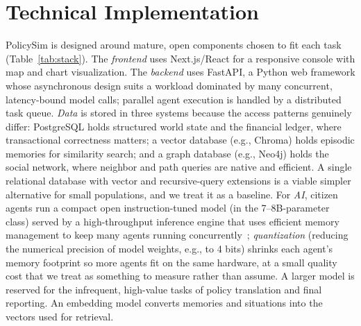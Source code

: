 \documentclass[conference]{IEEEtran}
\begin{document}
\section{Technical Implementation}
\label{sec:impl}

PolicySim is designed around mature, open components chosen to fit each task (Table~\ref{tab:stack}).
The \emph{frontend} uses Next.js/React for a responsive console with map and chart visualization.
The \emph{backend} uses FastAPI, a Python web framework whose asynchronous design suits a workload dominated by many concurrent, latency-bound model calls; parallel agent execution is handled by a distributed task queue.
\emph{Data} is stored in three systems because the access patterns genuinely differ: PostgreSQL holds structured world state and the financial ledger, where transactional correctness matters; a vector database (e.g., Chroma) holds episodic memories for similarity search; and a graph database (e.g., Neo4j) holds the social network, where neighbor and path queries are native and efficient. A single relational database with vector and recursive-query extensions is a viable simpler alternative for small populations, and we treat it as a baseline.
For \emph{AI}, citizen agents run a compact open instruction-tuned model (in the 7--8B-parameter class) served by a high-throughput inference engine that uses efficient memory management to keep many agents running concurrently~\cite{kwon2023}; \emph{quantization} (reducing the numerical precision of model weights, e.g., to 4 bits) shrinks each agent's memory footprint so more agents fit on the same hardware, at a small quality cost that we treat as something to measure rather than assume. A larger model is reserved for the infrequent, high-value tasks of policy translation and final reporting. An embedding model converts memories and situations into the vectors used for retrieval.
\end{document}
